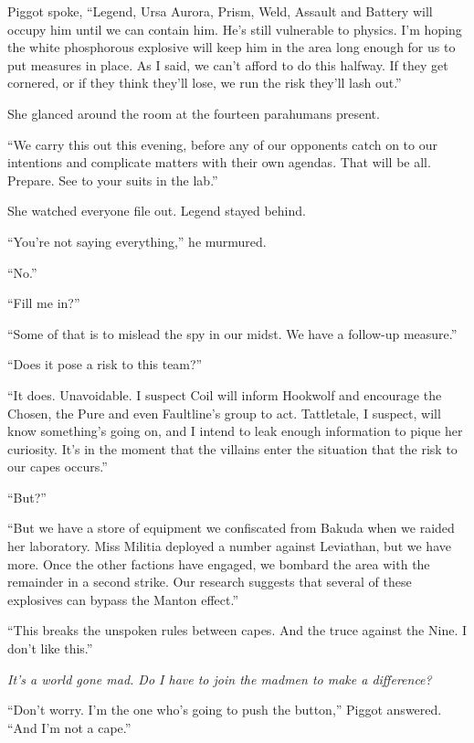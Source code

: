 Piggot spoke, ``Legend, Ursa Aurora, Prism, Weld, Assault and Battery will occupy him until we can contain him.  He's still vulnerable to physics.  I'm hoping the white phosphorous explosive will keep him in the area long enough for us to put measures in place.  As I said, we can't afford to do this halfway.  If they get cornered, or if they think they'll lose, we run the risk they'll lash out.''



She glanced around the room at the fourteen parahumans present.



``We carry this out this evening, before any of our opponents catch on to our intentions and complicate matters with their own agendas.  That will be all.  Prepare.  See to your suits in the lab.''



She watched everyone file out.  Legend stayed behind.



``You're not saying everything,'' he murmured.



``No.''



``Fill me in?''



``Some of that is to mislead the spy in our midst.  We have a follow-up measure.''



``Does it pose a risk to this team?''



``It does.  Unavoidable.  I suspect Coil will inform Hookwolf and encourage the Chosen, the Pure and even Faultline's group to act.  Tattletale, I suspect, will know something's going on, and I intend to leak enough information to pique her curiosity.  It's in the moment that the villains enter the situation that the risk to our capes occurs.''



``But?''



``But we have a store of equipment we confiscated from Bakuda when we raided her laboratory.  Miss Militia deployed a number against Leviathan, but we have more.  Once the other factions have engaged, we bombard the area with the remainder in a second strike.  Our research suggests that several of these explosives can bypass the Manton effect.''



``This breaks the unspoken rules between capes.  And the truce against the Nine.  I don't like this.''



\emph{It's a world gone mad.  Do I have to join the madmen to make a difference?}



``Don't worry.  I'm the one who's going to push the button,'' Piggot answered.  ``And I'm not a cape.''
